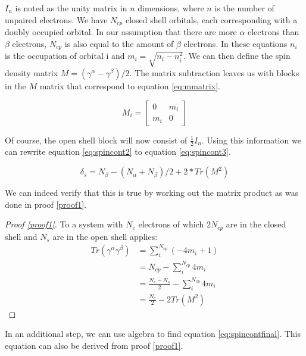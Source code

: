 \documentclass[twoside,twocolumn,9pt]{article}
\begin{document}
$I_n$ is noted as the unity matrix in $n$ dimensions, where $n$ is the number of unpaired electrons. We have $N_{cp}$ closed shell orbitals, each corresponding with a doubly occupied
orbital. In our assumption that there are more $\alpha$ electrons than $\beta$ electrons, $N_{cp}$ is also equal to the amount of $\beta$ electrons.
In these equations $n_i$ is the occupation of orbital i and $m_i = \sqrt{n_i - n_i^2}$\cite{Scuseria2010}. We can then define the spin density matrix
$M = (\gamma^\alpha - \gamma^\beta)/2$. The matrix subtraction leaves us with blocks in the $M$ matrix that correspond to equation \eqref{eq:mmatrix}.

\begin{equation}\label{eq:mmatrix}
  M_i = \begin{bmatrix}
    0   & m_i \\
    m_i & 0
  \end{bmatrix}
\end{equation}

Of course, the open shell block will now consist of $\frac{1}{2}I_n$. Using this information we can rewrite equation \eqref{eq:spincont2} to equation
\eqref{eq:spincont3}\cite{Scuseria2010}.

\begin{equation}\label{eq:spincont3}
  \delta_s = N_\beta - (N_\alpha + N_\beta)/2 + 2*Tr(M^2)
\end{equation}

We can indeed verify that this is true by working out the matrix product as was done in proof \ref{proof1}.

\begin{proof}[Proof \ref{proof1}]\label{proof1}
  To a system with $N_e$ electrons of which $2N_{cp}$ are in the closed shell and $N_s$ are in the open shell applies:
  \begin{align*}
    Tr(\gamma^\alpha\gamma^\beta) & = \sum^{N_{cp}}_i (-4m_i + 1)               \\
                                  & = N_{cp} - \sum^{N_{cp}}_i 4m_i             \\
                                  & = \frac{N_e - N_s}{2} -\sum^{N_{cp}}_i 4m_i \\
                                  & = \frac{N_e}{2} - 2Tr(M^2)
  \end{align*}
\end{proof}

In an additional step, we can use algebra to find equation \eqref{eq:spincontfinal}. This equation can also be derived from proof \ref{proof1}.
\end{document}
